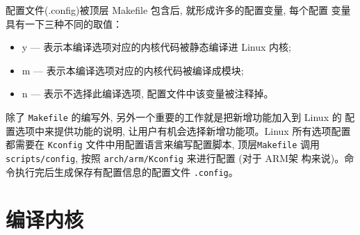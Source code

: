 配置文件(.config)被顶层 Makefile 包含后, 就形成许多的配置变量, 每个配置
变量具有一下三种不同的取值：
\begin{itemize}
    \item y --- 表示本编译选项对应的内核代码被静态编译进 Linux 内核;
    \item m --- 表示本编译选项对应的内核代码被编译成模块;
    \item n --- 表示不选择此编译选项, 配置文件中该变量被注释掉。
\end{itemize}

除了 \verb|Makefile| 的编写外, 另外一个重要的工作就是把新增功能加入到 Linux 的
配置选项中来提供功能的说明, 让用户有机会选择新增功能项。Linux 所有选项配置
都需要在 \verb|Kconfig| 文件中用配置语言来编写配置脚本, 顶层\verb|Makefile|
调用 \verb|scripts/config|,  按照 \verb|arch/arm/Kconfig| 来进行配置
(对于 ARM架 构来说)。命令执行完后生成保存有配置信息的配置文件 \verb|.config|。

\section{编译内核}
